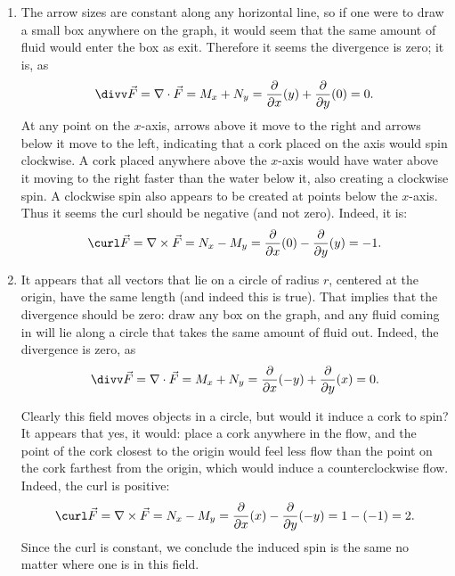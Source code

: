 {\begin{enumerate}
	\item The arrow sizes are constant along any horizontal line, so if one were to draw a small box anywhere on the graph, it would seem that the same amount of fluid would enter the box as exit. Therefore it seems the divergence is zero; it is, as 
	\[
	\divv\vec F
	= \nabla \cdot \vec F
	= M_x + N_y
	= \frac{\partial}{\partial x}(y) + \frac{\partial}{\partial y}(0) = 0.
	\]
	At any point on the $x$-axis, arrows above it move to the right and arrows below it move to the left, indicating that a cork placed on the axis would spin clockwise. A cork placed anywhere above the $x$-axis would have water above it moving to the right faster than the water below it, also creating a clockwise spin. A clockwise spin also appears to be created at points below the $x$-axis. Thus it seems the curl should be negative (and not zero). Indeed, it is:
	\[
	\curl \vec F = \nabla\times\vec F
	= N_x-M_y = \frac{\partial}{\partial x}(0) - \frac{\partial}{\partial y}(y) = -1.
	\]
	
	\item It appears that all vectors that lie on a circle of radius $r$, centered at the  origin, have the same length (and indeed this is true). That implies that the divergence should be zero: draw any box on the graph, and any fluid coming in will lie along a circle that takes the same amount of fluid out. Indeed, the divergence is zero, as
	\[
	\divv\vec F = \nabla \cdot \vec F
	= M_x + N_y = \frac{\partial}{\partial x}(-y) + \frac{\partial}{\partial y}(x)
	= 0.
	\]
	
		Clearly this field moves objects in a circle, but would it induce a cork to spin? It appears that yes, it would: place a cork anywhere in the flow, and the point of the cork closest to the origin would feel less flow than the point on the cork farthest from the origin, which would induce a counterclockwise flow. Indeed, the curl is positive:
	\[
	\curl \vec F = \nabla\times\vec F = N_x-M_y
	= \frac{\partial}{\partial x}(x) - \frac{\partial}{\partial y}(-y) = 1-(-1) = 2.
	\]
	Since the curl is constant, we conclude the induced spin is the same no matter where one is in this field.
	

\end{enumerate}}
